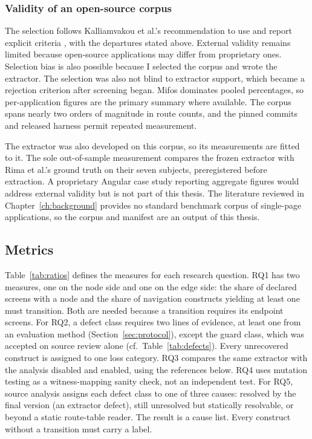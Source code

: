 \subsubsection{Validity of an open-source corpus}

The selection follows Kalliamvakou et al.'s recommendation to use and report explicit criteria
\cite{kalliamvakou2014promises,kalliamvakou2016indepth}, with the departures stated above.
External validity remains limited because open-source applications may differ from proprietary ones.
Selection bias is also possible because I selected the corpus and wrote the extractor. The selection was also not blind to extractor support, which became a rejection criterion after screening began. Mifos dominates pooled percentages, so per-application figures are the primary summary where
available. The corpus spans nearly two orders of magnitude in route counts, and the pinned commits
and released harness permit repeated measurement.

The extractor was also developed on this corpus, so its measurements are fitted to it. The sole out-of-sample measurement compares the frozen extractor
with Rima et al.'s ground truth on their seven subjects, preregistered before extraction. A proprietary Angular case study reporting aggregate figures would
address external validity but is not part of this thesis. The literature reviewed in
Chapter~\ref{ch:background} provides no standard benchmark corpus of single-page applications, so
the corpus and manifest are an output of this thesis.

\subsection{Metrics}
\label{sec:metrics}

Table~\ref{tab:ratios} defines the measures for each research question. RQ1 has two measures, one on the node side and one on the edge side: the
share of declared screens with a node and the share of navigation constructs yielding at least one
must transition. Both are needed because a transition requires its endpoint screens.
For RQ2, a defect class requires two lines of evidence, at least one from an evaluation method
(Section~\ref{sec:protocol}), except the guard class, which was accepted on source review alone
(cf.~Table~\ref{tab:defects}). Every unrecovered construct is assigned to one loss category.
RQ3 compares the same extractor with the analysis disabled and enabled, using the references below.
RQ4 uses mutation testing as a witness-mapping sanity check, not an independent test.
For RQ5, source analysis assigns each defect class to one of three causes:
resolved by the final version (an extractor defect), still unresolved but statically resolvable, or beyond
a static route-table reader. The result is a cause list. Every construct without a
transition must carry a label.


